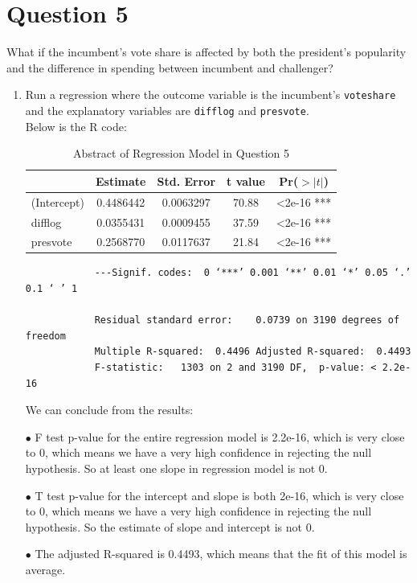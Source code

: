 \documentclass[12pt,letterpaper]{article}
\begin{document}
	\newpage	

\section*{Question 5}
\noindent What if the incumbent's vote share is affected by both the president's popularity and the difference in spending between incumbent and challenger? 
	\begin{enumerate}
		\item Run a regression where the outcome variable is the incumbent's \texttt{voteshare} and the explanatory variables are \texttt{difflog} and \texttt{presvote}.	\\
		
		Below is the R code:
		
		
		\begin{table}[ht]
			\centering
			\caption{Abstract of Regression Model in Question 5}
			\begin{tabular}{lcccc}
				\toprule
				& Estimate & Std. Error & t value & Pr($>|t|$) \\
				\midrule
				(Intercept) & 0.4486442 &0.0063297 & 70.88 &  <2e-16 *** \\
				difflog & 0.0355431 & 0.0009455& 37.59 & <2e-16 *** \\
				presvote & 0.2568770 & 0.0117637 & 21.84 & <2e-16 *** \\
				\bottomrule
			\end{tabular} 
		\end{table}
		\begin{verbatim}
			---Signif. codes:  0 ‘***’ 0.001 ‘**’ 0.01 ‘*’ 0.05 ‘.’ 0.1 ‘ ’ 1
			
			Residual standard error: 	0.0739 on 3190 degrees of freedom
			Multiple R-squared:  0.4496	Adjusted R-squared:  0.4493 
			F-statistic:   1303 on 2 and 3190 DF,  p-value: < 2.2e-16
		\end{verbatim}
		We can conclude from the results:
		\item[$\bullet$] F test p-value for the entire regression model is 2.2e-16, which is very close to 0, which means we have a very high confidence in rejecting the null hypothesis. So at least one slope in regression model is not 0.
		\item[$\bullet$] T test p-value for the intercept and slope is both 2e-16, which is very close to 0,  which means we have a very high confidence in rejecting the null hypothesis. So the estimate of slope and intercept is not 0.
		\item[$\bullet$] The adjusted R-squared is 0.4493, which means that the fit of this model is average.
		

\end{enumerate}
\end{document}
